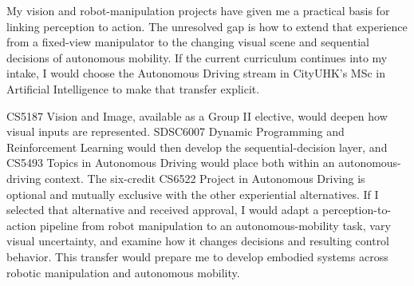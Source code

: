 My vision and robot-manipulation projects have given me a practical basis for linking perception to action. The unresolved gap is how to extend that experience from a fixed-view manipulator to the changing visual scene and sequential decisions of autonomous mobility. If the current curriculum continues into my intake, I would choose the Autonomous Driving stream in CityUHK's MSc in Artificial Intelligence to make that transfer explicit.

CS5187 Vision and Image, available as a Group II elective, would deepen how visual inputs are represented. SDSC6007 Dynamic Programming and Reinforcement Learning would then develop the sequential-decision layer, and CS5493 Topics in Autonomous Driving would place both within an autonomous-driving context. The six-credit CS6522 Project in Autonomous Driving is optional and mutually exclusive with the other experiential alternatives. If I selected that alternative and received approval, I would adapt a perception-to-action pipeline from robot manipulation to an autonomous-mobility task, vary visual uncertainty, and examine how it changes decisions and resulting control behavior. This transfer would prepare me to develop embodied systems across robotic manipulation and autonomous mobility.

